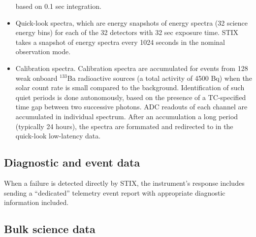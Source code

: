\documentclass[referee]{aa} %
\begin{document}
\begin{itemize}
based on 0.1 sec integration.
\item Quick-look spectra, which are energy snapshots of energy spectra (32 science energy bins) for
each of the 32 detectors with 32 sec exposure time.
STIX takes a snapshot of energy spectra every 1024
seconds in the nominal observation mode.
\item Calibration spectra. Calibration spectra are accumulated for events from 128 weak onboard $^{133}$Ba radioactive sources 
(a total activity of 4500 Bq) 
 when the solar count rate is small compared to the background.
Identification of such quiet periods is done autonomously, based on the presence of a
TC-specified time gap between two successive photons.  
ADC readouts of each channel are accumulated in individual spectrum.
After an accumulation a long period (typically 24 hours),  the spectra are 
formmated and redirected to in the quick-look low-latency data.
\end{itemize}
\subsection{Diagnostic and event data}
When a failure is detected directly by STIX, the instrument’s response includes sending a
“dedicated” telemetry event report with appropriate diagnostic information included.

\subsection{Bulk science data}
\end{document}
